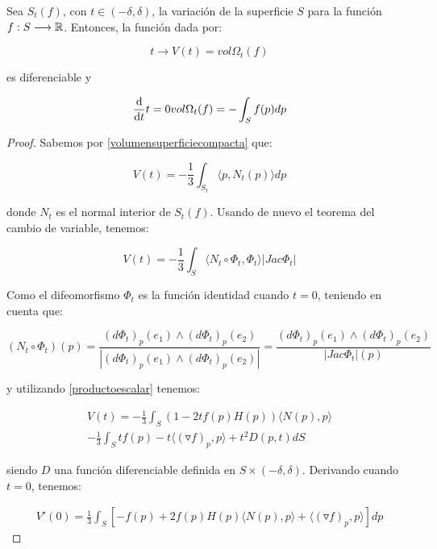 \begin{remark}
Sea $S_t(f)$, con $t \in (-\delta, \delta)$, la variación de la superficie $S$ para la función $f: S \longrightarrow \mathbb{R}$. Entonces, la función dada por:

\begin{equation*}
    t \longrightarrow V(t) = vol \Omega_t (f)
\end{equation*}

es diferenciable y

\begin{equation}\label{variacionvolumen}
    \diff{}{t}{t=0} vol \Omega_t (f) = - \int_S f(p) dp
\end{equation}
\begin{proof}
Sabemos por \autoref{volumensuperficiecompacta} que:

\begin{equation*}
    V(t) = - \frac{1}{3} \int_{S_t}  \langle p, N_t(p) \rangle  dp
\end{equation*}

donde $N_t$ es el normal interior de $S_t(f)$. Usando de nuevo el teorema del cambio de variable, tenemos:

\begin{equation*}
    V(t) = - \frac{1}{3} \int_{S}  \langle N_t \circ \Phi_t, \Phi_t \rangle |Jac \Phi_t|
\end{equation*}

Como el difeomorfismo $\Phi_t$ es la función identidad cuando $t=0$, teniendo en cuenta que:

\begin{equation*}
    (N_t \circ \Phi_t)(p) = \frac{(d\Phi_t)_p(e_1) \wedge (d\Phi_t)_p(e_2)}{|(d\Phi_t)_p(e_1) \wedge (d\Phi_t)_p(e_2)|} = \frac{(d\Phi_t)_p(e_1) \wedge (d\Phi_t)_p(e_2)}{|Jac \Phi_t|(p)}
\end{equation*}

y utilizando \autoref{productoescalar} tenemos:

\begin{align*}
    V(t) = - \frac{1}{3} \int_S (1-2tf(p)H(p)) \langle N(p), p \rangle  \\ - \frac{1}{3} \int_S tf(p) - t \langle (\triangledown f)_p, p \rangle  + t^2D(p,t) dS
\end{align*}

siendo $D$ una función diferenciable definida en $S \times (-\delta, \delta)$. Derivando cuando $t=0$, tenemos:

\begin{align*}
    V'(0) = \frac{1}{3} \int_S [-f(p) + 2f(p)H(p) \langle N(p),p \rangle  +  \langle (\triangledown f)_p, p \rangle ] dp
\end{align*}


\end{proof}
\end{remark}
